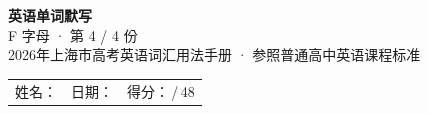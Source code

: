 \documentclass[10pt,a4paper]{article}
\begin{document}
\pagestyle{plain}

\begin{center}
{\LARGE\bfseries 英语单词默写}\\[0.22em]
{\large F 字母 · 第 4 / 4 份}\\[0.18em]
{\small 2026年上海市高考英语词汇用法手册 · 参照普通高中英语课程标准}
\end{center}

\vspace{0.25em}
\noindent\begin{tabular}{@{}p{}@{}p{}@{}p{}@{}}
姓名：\underline{\hspace{2.0cm}} & 日期：\underline{\hspace{2.0cm}} & 得分：\underline{\hspace{1.3cm}}\,/\,48 \\
\end{tabular}

\vspace{0.3em}

\vspace{0.08em}
\end{document}
